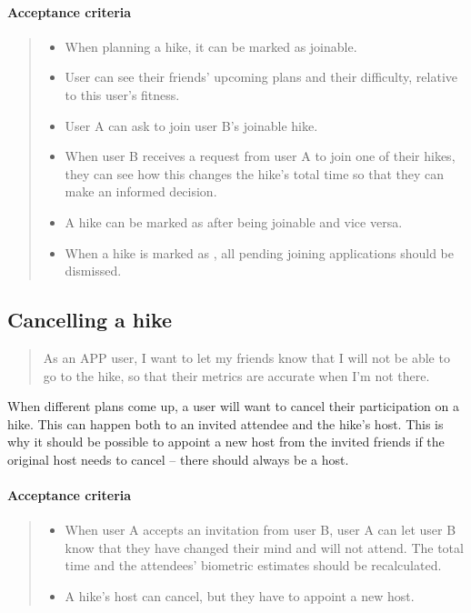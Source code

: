 \paragraph*{Acceptance criteria}
\begin{quote}
\begin{itemize}
    \item When planning a hike, it can be marked as joinable.
    \item User can see their friends' upcoming plans and their difficulty, relative to this user's fitness.
    \item User A can ask to join user B's joinable hike.
    \item When user B receives a request from user A to join one of their hikes, they can see how this changes the hike's total time so that they can make an informed decision.
    \item A hike can be marked as  after being joinable and vice versa.
    \item When a hike is marked as , all pending joining applications should be dismissed.
\end{itemize}
\end{quote}

\subsection{Cancelling a hike}\label{US:friends-cancel-hike}
\begin{quote}
As an APP user, I want to let my friends know that I will not be able to go to the hike, so that their metrics are accurate when I'm not there.
\end{quote}

When different plans come up, a user will want to cancel their participation on a hike.
This can happen both to an invited attendee and the hike's host.
This is why it should be possible to appoint a new host from the invited friends if the original host needs to cancel -- there should always be a host.

\paragraph*{Acceptance criteria}
\begin{quote}
\begin{itemize}
    \item When user A accepts an invitation from user B, user A can let user B know that they have changed their mind and will not attend. The total time and the attendees' biometric estimates should be recalculated.
    \item A hike's host can cancel, but they have to appoint a new host.
\end{itemize}
\end{quote}


